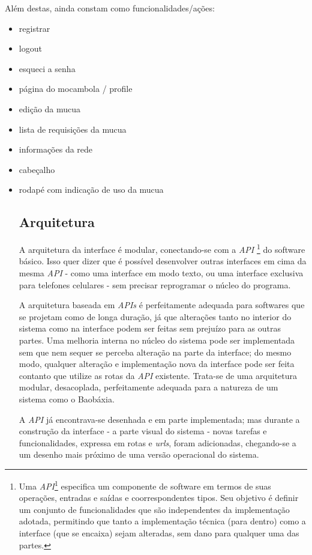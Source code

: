 Além destas, ainda constam como funcionalidades/ações:
\begin{itemize}
\item registrar
\item logout
\item esqueci a senha
\item página do mocambola / profile
\item edição da mucua
\item lista de requisições da mucua
\item informações da rede
\item cabeçalho
\item rodapé com indicação de uso da mucua

\subsection{Arquitetura}
A arquitetura da interface é modular, conectando-se com a \emph{API}
\footnote{Uma \emph{API}\footnote{Application programming interface}
  especifica um componente de software em termos de suas operações,
  entradas e saídas e coorrespondentes tipos. Seu objetivo é definir
  um conjunto de funcionalidades que são independentes da implementação
  adotada, permitindo que tanto a implementação técnica (para dentro)
  como a interface (que se encaixa) sejam alteradas, sem dano para
  qualquer uma das partes.} do software básico. Isso quer dizer que
é possível desenvolver outras interfaces em cima da mesma \emph{API}
- como uma interface em modo texto, ou uma interface exclusiva para
telefones celulares - sem precisar reprogramar o núcleo do programa.

A arquitetura baseada em \emph{APIs} é perfeitamente adequada para
softwares que se projetam como de longa duração, já que alterações
tanto no interior do sistema como na interface podem ser feitas sem
prejuízo para as outras partes. Uma melhoria interna no núcleo do sistema
pode ser implementada sem que nem sequer se perceba alteração na parte
da interface; do mesmo modo, qualquer alteração e implementação nova da
interface pode ser feita contanto que utilize as rotas da \emph{API}
existente. Trata-se de uma arquitetura modular, desacoplada,
perfeitamente adequada para a natureza de um sistema como o Baobáxia.

A \emph{API} já encontrava-se desenhada e em parte implementada; mas
durante a construção da interface - a parte visual do sistema - novas
tarefas e funcionalidades, expressa em rotas e \emph{urls}, foram
adicionadas, chegando-se a um desenho mais próximo de uma versão
operacional do sistema. 


\end{itemize}
